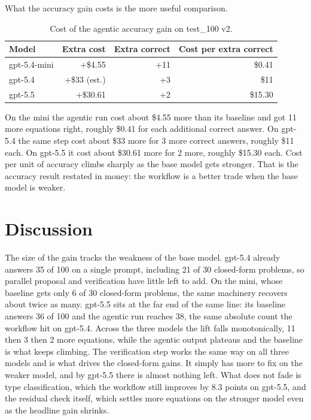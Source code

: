 \documentclass[11pt]{article}
\begin{document}
What the accuracy gain costs is the more useful comparison.

\begin{table}[h]
\centering
\caption{Cost of the agentic accuracy gain on test\_100 v2.}
\begin{tabular}{lrrr}
\toprule
Model & Extra cost & Extra correct & Cost per extra correct \\
\midrule
gpt-5.4-mini & +\$4.55        & +11 & \$0.41 \\
gpt-5.4      & +\$33 (est.)   & +3  & \$11 \\
gpt-5.5      & +\$30.61       & +2  & \$15.30 \\
\bottomrule
\end{tabular}
\end{table}

On the mini the agentic run cost about \$4.55 more than its baseline and got 11
more equations right, roughly \$0.41 for each additional correct answer. On
gpt-5.4 the same step cost about \$33 more for 3 more correct answers, roughly
\$11 each. On gpt-5.5 it cost about \$30.61 more for 2 more, roughly \$15.30
each. Cost per unit of accuracy climbs sharply as the base model gets stronger.
That is the accuracy result restated in money: the workflow is a better trade
when the base model is weaker.

\section{Discussion}
The size of the gain tracks the weakness of the base model. gpt-5.4 already
answers 35 of 100 on a single prompt, including 21 of 30 closed-form problems,
so parallel proposal and verification have little left to add. On the mini,
whose baseline gets only 6 of 30 closed-form problems, the same machinery
recovers about twice as many. gpt-5.5 sits at the far end of the same line: its
baseline answers 36 of 100 and the agentic run reaches 38, the same absolute
count the workflow hit on gpt-5.4. Across the three models the lift falls
monotonically, 11 then 3 then 2 more equations, while the agentic output
plateaus and the baseline is what keeps climbing. The verification step works
the same way on all three models and is what drives the closed-form gains. It
simply has more to fix on the weaker model, and by gpt-5.5 there is almost
nothing left. What does not fade is type classification, which the workflow
still improves by 8.3 points on gpt-5.5, and the residual check itself, which
settles more equations on the stronger model even as the headline gain shrinks.
\end{document}
